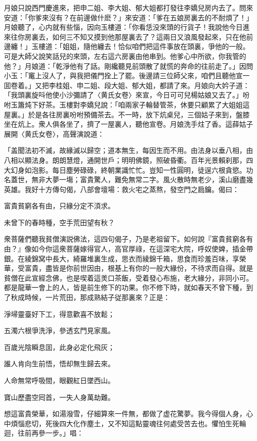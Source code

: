 月娘只說西門慶進來，把申二姐、李大姐、郁大姐都打發往李嬌兒房内去了。問來安道：「你爹來沒有？在前邊做什麽？」來安道：「爹在五娘房裏去的不耐煩了！」月娘聽了，心内就有些惱，因向玉樓道：「你看恁没來頭的行貨子！我說他今日進來往你房裏去，如何三不知又摸到他那屋裏去了？這兩日又浪風發起來，只在他前邊纏！」玉樓道：「姐姐，隨他纏去！恰似咱們把這件事放在頭裏，爭他的一般。可是大師父說笑話兒的來頭，左右這六房裏由他串到。他爹心中所欲，你我管的他？」月娘道：「乾淨他有了話。剛纔聽見前頭散了就慌的奔命的往前走了。」因問小玉：「竃上沒人了，與我把儀門拴上了罷。後邊請三位師父來，咱們且聽他宣一囬卷着。」又把李桂姐、申二姐、段大姐、郁大姐，都請了來。月娘向大妗子道：「我頭裏旋呌他使小沙彌請了〈黄氏女卷〉來宣，今日可可兒楊姑娘又去了。」吩咐玉簫炖下好茶。玉樓對李嬌兒說：「咱兩家子輪替管茶，休要只顧累了大姐姐這屋裏。」於是各往房裏吩咐預備茶去。不一時，放下炕桌兒，三個姑子來到，盤膝坐在炕上。衆人俱各坐了，擠了一屋裏人，聽他宣卷。月娘洗手炷了香。這薛姑子展開〈黄氏女卷〉，高聲演說道：

「盖聞法初不滅，故緣滅以歸空；道本無生，每因生而不用。由法身以垂八相，由八相以顯法身。朗朗慧燈，通開世戶；明明佛鏡，照破昏衢。百年光景賴刹那，四大幻身如泡影。每日塵勞碌碌，終朝業識忙忙。豈知一性圓明，徒逞六根貪慾。功名蓋世，無非大夢一塲；富貴驚人，難免無常二字。風火散時無老少，溪山磨盡幾英雄。我好十方傳句偈，八部會壇場：救火宅之蒸熬，發空門之扃鑰。偈曰：

富貴貧窮各有由，只緣分定不湏求。

未曾下的春時種，空手荒田望有秋？　

衆菩薩們聽我貧僧演説佛法，這四句偈子，乃是老祖留下。如何說『富貴貧窮各有由？』像如今你這衆菩薩嫁得官人，高官厚祿，在這深宅大院，呼奴使婢，插金帶銀。在綾錦窝中長大，綺羅堆裏生成，思衣而綾錦千箱，思食而珍羞百味，享榮華，受富貴，盡皆是你前世因由，根基上有你的一般大緣份，不待求而自得。就是貧僧在此宣經念佛，也是喫着這羙口茶飯，受着發心布施，老大緣分，非同小可。都是龍華一會上的人，皆是前生修下的功果。你不修下時，就如春天不曾下種，到了秋成時候，一片荒田，那成熟結子従那裏來？正是：

淨埽靈臺好下工，得意歡喜不放鬆；

五濁六根爭洗淨，參透玄門見家風。

百歲光陰瞬息囬，此身必定化飛灰；

誰人肯向生前悟，悟却無生歸去來。

人命無常呼吸間，眼觀紅日墜西山。

寶山歷盡空囘首，一失人身萬劫難。

想這富貴榮華，如湯潑雪，仔細算來一件無，都做了虚花驚夢。我今得個人身，心中煩惱悲切，死後四大化作塵土，又不知這點靈魂往何處受苦去也。懼怕生死輪迴，往前再參一步。」唱：


